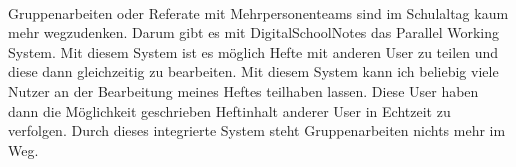\\
Gruppenarbeiten oder Referate mit Mehrpersonenteams sind im Schulaltag kaum mehr wegzudenken. Darum gibt es mit DigitalSchoolNotes das Parallel Working System. Mit diesem System ist es möglich Hefte mit anderen User zu teilen und diese dann gleichzeitig zu bearbeiten. Mit diesem System kann ich beliebig viele Nutzer an der Bearbeitung meines Heftes teilhaben lassen. Diese User haben dann die Möglichkeit geschrieben Heftinhalt anderer User in Echtzeit zu verfolgen. Durch dieses integrierte System steht Gruppenarbeiten nichts mehr im Weg.

